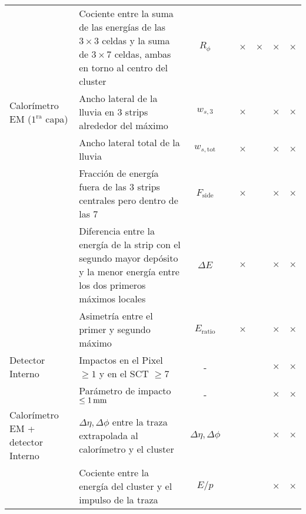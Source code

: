\begin{table}[!htbp]
\begin{tabular}{y{3cm} p{7cm} c | cc | ccc}
                 & Cociente entre la suma de las energías de las
                   $3\times 3$ celdas y la suma de $3\times 7$
                   celdas, ambas en torno al centro del cluster     & $R_\phi$                &   & $\times$ & $\times$ & $\times$ & $\times$ \\


   Calorímetro EM ($1^\mathrm{ra}$ capa) & Ancho lateral de la lluvia en 3 strips alrededor
                  del máximo                                        & $w_{s,3}$               &   & $\times$ &   & $\times$ & $\times$ \\

                & Ancho lateral total de la lluvia                  & $w_{s,\mathrm{tot}}$    &   & $\times$ &   & $\times$ & $\times$ \\

                & Fracción de energía fuera de las 3 strips
                  centrales pero dentro de las 7                    & $F_{\mathrm{side}}$     &   & $\times$ &   & $\times$ & $\times$ \\

                & Diferencia entre la energía de la strip con el
                  segundo mayor depósito y la menor energía entre
                  los dos primeros máximos locales                  & $\Delta E$              &   & $\times$ &   & $\times$ & $\times$ \\

                & Asimetría entre el primer y segundo máximo        & $E_{\mathrm{ratio}}$    &   & $\times$ &   & $\times$ & $\times$ \\


  Detector Interno            & Impactos en el Pixel $\geq 1$ y en el
                  SCT $\geq 7$                                      & -                       &   &   &   & $\times$ & $\times$ \\

                & Parámetro de impacto $\leq \unit[1]{mm}$          & -                       &   &   &   & $\times$ & $\times$ \\


  Calorímetro EM +
  detector Interno         & $\Delta\eta,\Delta\phi$ entre la traza
                  extrapolada al calorímetro y el cluster           & $\Delta\eta,\Delta\phi$ &  &   &   & $\times$ & $\times$ \\

                & Cociente entre la energía del cluster y el impulso
                  de la traza                                       & $E/p$                   &  &   &   & $\times$ & $\times$ \\



\end{tabular}
\end{table}
